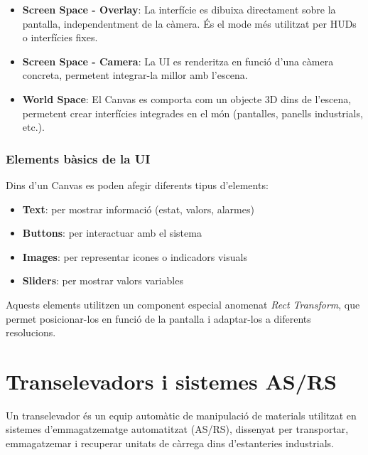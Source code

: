 \documentclass[a4paper,11pt,DIV=13,headings=normal,abstract=true,twoside=semi]{article}
\begin{document}
\begin{itemize}

\item \textbf{Screen Space - Overlay}:  
La interfície es dibuixa directament sobre la pantalla, independentment de la càmera. És el mode més utilitzat per HUDs o interfícies fixes.

\item \textbf{Screen Space - Camera}:  
La UI es renderitza en funció d'una càmera concreta, permetent integrar-la millor amb l'escena.

\item \textbf{World Space}:  
El Canvas es comporta com un objecte 3D dins de l'escena, permetent crear interfícies integrades en el món (pantalles, panells industrials, etc.).

\end{itemize}


\subsubsection{Elements bàsics de la UI}

Dins d'un Canvas es poden afegir diferents tipus d'elements:

\begin{itemize}
\item \textbf{Text}: per mostrar informació (estat, valors, alarmes)
\item \textbf{Buttons}: per interactuar amb el sistema
\item \textbf{Images}: per representar icones o indicadors visuals
\item \textbf{Sliders}: per mostrar valors variables
\end{itemize}

Aquests elements utilitzen un component especial anomenat \textit{Rect Transform}, que permet posicionar-los en funció de la pantalla i adaptar-los a diferents resolucions. 

\newpage
\section{Transelevadors i sistemes AS/RS}

Un transelevador \cite{transelevador_info} és un equip automàtic de manipulació de materials utilitzat en sistemes d'emmagatzematge automatitzat (AS/RS), dissenyat per transportar, emmagatzemar i recuperar unitats de càrrega dins d'estanteries industrials.
\end{document}
